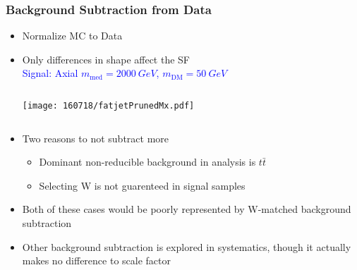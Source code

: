 \documentclass{beamer}
\begin{document}
\begin{frame}
  \frametitle{Background Subtraction from Data}
  \begin{itemize}
  \item Normalize MC to Data
  \item Only differences in shape affect the SF \vspace{-2pt} \\
    \textcolor{blue}{\scriptsize \hspace{-35pt} Signal: Axial
      $m_\text{med} = \SI{2000}{GeV}$,
      $m_\text{DM} = \SI{50}{GeV}$}
    \begin{columns}
      \begin{column}{0.4\linewidth}
        \centering
        \texttt{[image: 160718/fatjetPrunedMx.pdf]}
      \end{column}
    \end{columns}
  \item Two reasons to not subtract more
    \begin{itemize}
    \item Dominant non-reducible background in analysis is $t\bar{t}$
    \item Selecting W is not guarenteed in signal samples
    \end{itemize}
  \item Both of these cases would be poorly represented by
    W-matched background subtraction
  \item Other background subtraction is explored in systematics, though it actually makes no
    difference to scale factor
  \end{itemize}
\end{frame}
\end{document}
